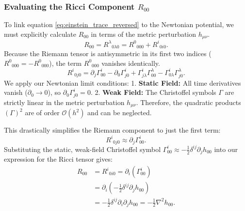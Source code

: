 \documentclass[11pt, a4paper]{report}
\begin{document}
\subsubsection*{Evaluating the Ricci Component $R_{00}$}
To link equation \eqref{eq:einstein_trace_reversed} to the Newtonian potential, we must explicitly calculate $R_{00}$ in terms of the metric perturbation $h_{\mu\nu}$. %
\begin{equation}
R_{00} = {R^{\lambda}}_{0\lambda 0} = {R^{0}}_{000} + {R^{i}}_{0i0}.
\end{equation}
Because the Riemann tensor is antisymmetric in its first two indices (${R^{0}}_{000} = -{R^{0}}_{000}$), the term ${R^{0}}_{000}$ vanishes identically. %
\begin{equation}
{R^{i}}_{0j0} = \partial_{j}\Gamma^{i}_{00} - \partial_{0}\Gamma^{i}_{j0} + \Gamma^{i}_{j\lambda}\Gamma^{\lambda}_{00} - \Gamma^{i}_{0\lambda}\Gamma^{\lambda}_{j0}. %
\end{equation}
We apply our Newtonian limit conditions:
1. \textbf{Static Field:} All time derivatives vanish ($\partial_{0} \to 0$), so $\partial_{0}\Gamma^{i}_{j0} = 0$. %
2. \textbf{Weak Field:} The Christoffel symbols $\Gamma$ are strictly linear in the metric perturbation $h_{\mu\nu}$. Therefore, the quadratic products $(\Gamma)^{2}$ are of order $\mathcal{O}(h^{2})$ and can be neglected. %

This drastically simplifies the Riemann component to just the first term:
\begin{equation}
{R^{i}}_{0j0} \approx \partial_{j}\Gamma^{i}_{00}. %
\end{equation}
Substituting the static, weak-field Christoffel symbol $\Gamma^{i}_{00} \approx -\frac{1}{2}\delta^{ij}\partial_{j}h_{00}$ into our expression for the Ricci tensor gives: %
\begin{align}
R_{00} &= {R^{i}}_{0i0} = \partial_{i}(\Gamma^{i}_{00}) \nonumber \\
&= \partial_{i}\left(-\frac{1}{2}\delta^{ij}\partial_{j}h_{00}\right) \nonumber \\
&= -\frac{1}{2}\delta^{ij}\partial_{i}\partial_{j}h_{00} = -\frac{1}{2}\nabla^{2}h_{00}. %
\end{align}
\end{document}
